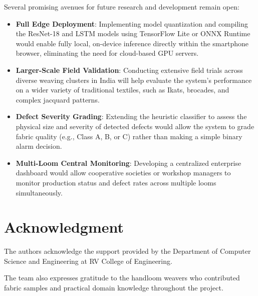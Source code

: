 \documentclass{ieeeaccess}
\begin{document}
Several promising avenues for future research and development remain open:
\begin{itemize}
    \item \textbf{Full Edge Deployment}: Implementing model quantization and compiling the ResNet-18 and LSTM models using TensorFlow Lite or ONNX Runtime would enable fully local, on-device inference directly within the smartphone browser, eliminating the need for cloud-based GPU servers.
    \item \textbf{Larger-Scale Field Validation}: Conducting extensive field trials across diverse weaving clusters in India will help evaluate the system's performance on a wider variety of traditional textiles, such as Ikats, brocades, and complex jacquard patterns.
    \item \textbf{Defect Severity Grading}: Extending the heuristic classifier to assess the physical size and severity of detected defects would allow the system to grade fabric quality (e.g., Class A, B, or C) rather than making a simple binary alarm decision.
    \item \textbf{Multi-Loom Central Monitoring}: Developing a centralized enterprise dashboard would allow cooperative societies or workshop managers to monitor production status and defect rates across multiple looms simultaneously.
\end{itemize}

\section*{Acknowledgment}

The authors acknowledge the support provided by the Department of Computer Science and Engineering at RV College of Engineering.

The team also expresses gratitude to the handloom weavers who contributed fabric samples and practical domain knowledge throughout the project. \EOD
\end{document}
